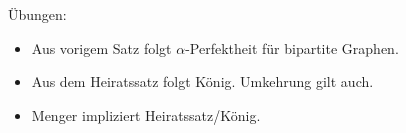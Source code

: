 \begin{ex}
    Übungen:
    \begin{itemize}
        \item
            Aus vorigem Satz folgt $\alpha$-Perfektheit für bipartite Graphen.
        \item
            Aus dem Heiratssatz folgt König.
            Umkehrung gilt auch.
        \item
            Menger impliziert Heiratssatz/König.
    \end{itemize}
\end{ex}


